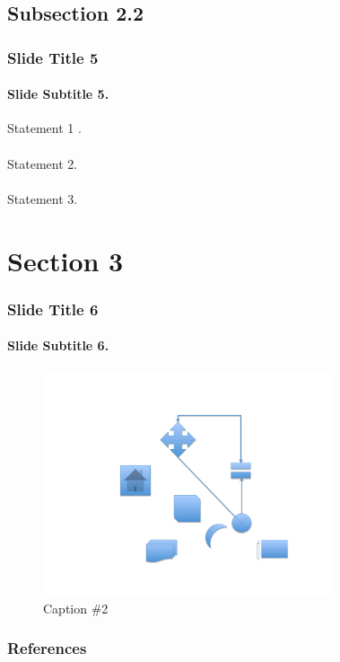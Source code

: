 \documentclass[xcolor={usenames,dvipsnames},hyperref={hyperindex,bookmarks}]{beamer}
\begin{document}
\subsection{Subsection 2.2}

\begin{frame}
	\frametitle{Slide Title 5}
	\framesubtitle{Slide Subtitle 5.}
	
	Statement 1 \cite{vanDongen2012}. \\
	\ \\
	Statement 2. \\
	\ \\
	Statement 3.
\end{frame}

\section{Section 3}

\begin{frame}
	\frametitle{Slide Title 6}
	\framesubtitle{Slide Subtitle 6.}
	
	\begin{figure}
		\centering
		\includegraphics[height=2.6in]{./pics/my_figure}
		\caption{Caption \#2}
	\end{figure}
\end{frame}




{\linespread{1}
\begin{frame}
	\frametitle{References}
	
	
\end{frame}
}
\end{document}
